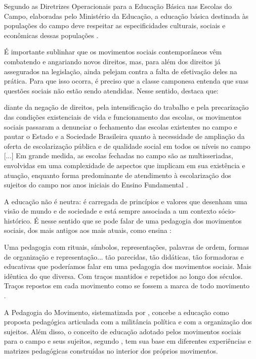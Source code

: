 \documentclass[
  12pt,
  openright,
  twoside,
  a4paper,
  english,
  brazilian,
  sumario=tradicional
]{abntex2}
\begin{document}
Segundo as Diretrizes Operacionais para a Educação Básica nas Escolas do Campo, elaboradas pelo Ministério da Educação, a educação básica destinada às populações do campo deve respeitar as especificidades culturais, sociais e econômicas dessas populações \cite{brasil2002}.

É importante sublinhar que os movimentos sociais contemporâneos vêm combatendo e angariando novos direitos, mas, para além dos direitos já assegurados na legislação, ainda pelejam contra a falta de efetivação deles na prática. Para que isso ocorra, é preciso que a classe camponesa entenda que suas questões sociais não estão sendo atendidas. Nesse sentido,  destaca que:

\begin{citacao}[default]
[...] diante da negação de direitos, pela intensificação do trabalho e pela precarização das condições existenciais de vida e funcionamento das escolas, os movimentos sociais passaram a denunciar o fechamento das escolas existentes no campo e pautar o Estado e a Sociedade Brasileira quanto à necessidade de ampliação da oferta de escolarização pública e de qualidade social em todos os níveis no campo [...] Em grande medida, as escolas fechadas no campo são as multisseriadas, envolvidas em uma complexidade de aspectos que implicam em sua existência e atuação, enquanto forma predominante de atendimento à escolarização dos sujeitos do campo nos anos iniciais do Ensino Fundamental \cite[p.~1173]{hage2014}.
\end{citacao}

A educação não é neutra: é carregada de princípios e valores que desenham uma visão de mundo e de sociedade e está sempre associada a um contexto sócio-histórico. É nesse sentido que se pode falar de uma pedagogia dos movimentos sociais, dos mais antigos aos mais atuais, como ensina :

\begin{citacao}
Uma pedagogia com rituais, símbolos, representações, palavras de ordem, formas de organização e representação... tão parecidas, tão didáticas, tão formadoras e educativas que poderíamos falar em uma pedagogia dos movimentos sociais. Mais idêntica do que diversa. Com traços mantidos e repetidos ao longo dos séculos. Traços repostos em cada movimento como se fossem a marca de todo movimento \cite[p.~47]{arroyo2003}.
\end{citacao}

A Pedagogia do Movimento, sistematizada por , concebe a educação como proposta pedagógica articulada com a militância política e com a organização dos sujeitos. Além disso, o conceito de educação adotado pelos movimentos sociais para o campo e seus sujeitos, segundo , tem sua base em diferentes experiências e matrizes pedagógicas construídas no interior dos próprios movimentos.
\end{document}
